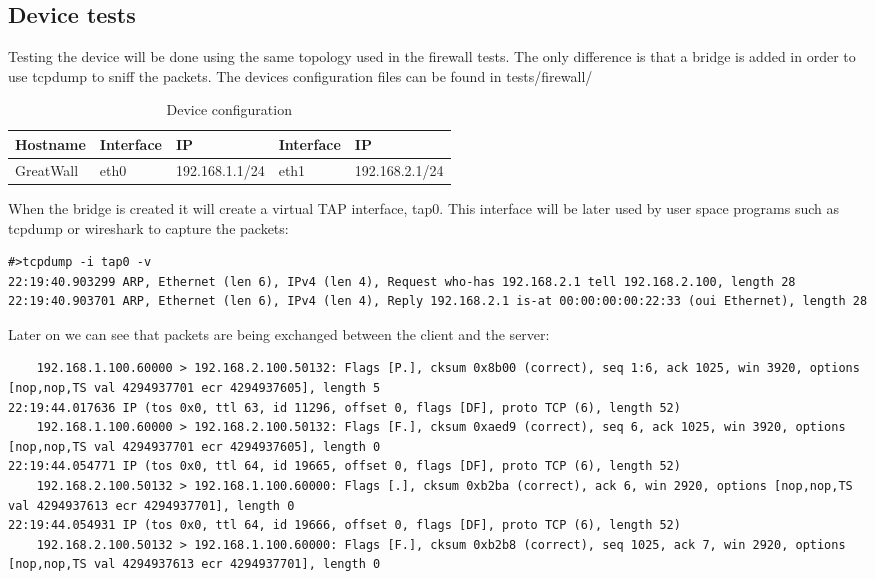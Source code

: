 \subsection{Device tests}
\label{sub-sec:bridge-tests}

Testing the device will be done using the same topology used in the firewall tests. The only difference
is that a bridge is added in order to use tcpdump to sniff the packets. The devices configuration files
can be found in tests/firewall/


\begin{center}
  \begin{table}[htb]
  \begin{center}
  \begin{tabular}{| l | l | l | l | l |}
    \hline
      Hostname & Interface & IP & Interface & IP \\ \hline
      GreatWall & eth0 & 192.168.1.1/24 & eth1 & 192.168.2.1/24 \\ 
    \hline
  \end{tabular}
  \end{center}
  \caption{Device configuration}
  \label{table:tdevices}
  \end{table}
\end{center}

When the bridge is created it will create a virtual TAP interface,  tap0. This interface will be later used
by user space programs such as tcpdump or wireshark to capture the packets:

\lstset{language=text, caption=Arp request and response}
\begin{lstlisting}
#>tcpdump -i tap0 -v
22:19:40.903299 ARP, Ethernet (len 6), IPv4 (len 4), Request who-has 192.168.2.1 tell 192.168.2.100, length 28
22:19:40.903701 ARP, Ethernet (len 6), IPv4 (len 4), Reply 192.168.2.1 is-at 00:00:00:00:22:33 (oui Ethernet), length 28
\end{lstlisting}

Later on we can see that packets are being exchanged between the client and the server:
\lstset{language=text, caption=TCP traffic}
\begin{lstlisting}
    192.168.1.100.60000 > 192.168.2.100.50132: Flags [P.], cksum 0x8b00 (correct), seq 1:6, ack 1025, win 3920, options [nop,nop,TS val 4294937701 ecr 4294937605], length 5
22:19:44.017636 IP (tos 0x0, ttl 63, id 11296, offset 0, flags [DF], proto TCP (6), length 52)
    192.168.1.100.60000 > 192.168.2.100.50132: Flags [F.], cksum 0xaed9 (correct), seq 6, ack 1025, win 3920, options [nop,nop,TS val 4294937701 ecr 4294937605], length 0
22:19:44.054771 IP (tos 0x0, ttl 64, id 19665, offset 0, flags [DF], proto TCP (6), length 52)
    192.168.2.100.50132 > 192.168.1.100.60000: Flags [.], cksum 0xb2ba (correct), ack 6, win 2920, options [nop,nop,TS val 4294937613 ecr 4294937701], length 0
22:19:44.054931 IP (tos 0x0, ttl 64, id 19666, offset 0, flags [DF], proto TCP (6), length 52)
    192.168.2.100.50132 > 192.168.1.100.60000: Flags [F.], cksum 0xb2b8 (correct), seq 1025, ack 7, win 2920, options [nop,nop,TS val 4294937613 ecr 4294937701], length 0
\end{lstlisting}

